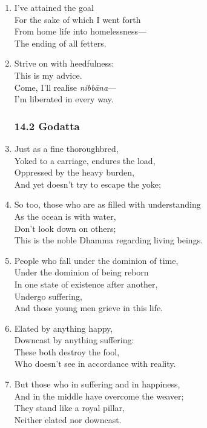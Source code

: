 \documentclass[10pt, openany]{book}
\begin{document}
\begin{enumerate}
\item I’ve attained the goal\\
For the sake of which I went forth\\
From home life into homelessness—\\
The ending of all fetters.

\item Strive on with heedfulness:\\
This is my advice.\\
Come, I’ll realise \emph{nibbāna}—\\
I’m liberated in every way.

\subsubsection*{14.2 Godatta}

\item Just as a fine thoroughbred,\\
Yoked to a carriage, endures the load,\\
Oppressed by the heavy burden,\\
And yet doesn’t try to escape the yoke;

\item So too, those who are as filled with understanding\\
As the ocean is with water,\\
Don’t look down on others;\\
This is the noble Dhamma regarding living beings.

\item People who fall under the dominion of time,\\
Under the dominion of being reborn \\
In one state of existence after another,\\
Undergo suffering,\\
And those young men grieve in this life.

\item Elated by anything happy,\\
Downcast by anything suffering:\\
These both destroy the fool,\\
Who doesn’t see in accordance with reality.

\item But those who in suffering and in happiness,\\
And in the middle have overcome the weaver;\\
They stand like a royal pillar,\\
Neither elated nor downcast.


\end{enumerate}
\end{document}
